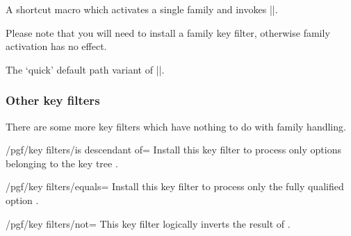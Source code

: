 \begin{command}{\pgfkeysactivatesinglefamilyandfilteroptions{}}%
	A shortcut macro which activates a single family and invokes |\pgfkeysfiltered|.

	Please note that you will need to install a family key filter, otherwise family activation has no effect.
\end{command}
\begin{command}{\pgfqkeysactivatesinglefamilyandfilteroptions{}}%
	The `quick' default path variant of |\pgfkeysactivatesinglefamilyandfilteroptions|.
\end{command}

\subsubsection{Other key filters}
There are some more key filters which have nothing to do with family handling.
\begin{key}{/pgf/key filters/is descendant of=}
	Install this key filter to process only options belonging to the key tree .
\begin{codeexample}[]
\end{codeexample}
\end{key}

\begin{key}{/pgf/key filters/equals=}
	Install this key filter to process only the fully qualified option .
\begin{codeexample}[]
\end{codeexample}
\end{key}

\begin{key}{/pgf/key filters/not=}
	This key filter logically inverts the result of .
\begin{codeexample}[]
\end{codeexample}
\end{key}

